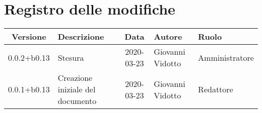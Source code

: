 \section*{Registro delle modifiche}

\begin{center}
	\begin{longtable}{|c|p{3.5cm}|c|p{3cm}|p{3cm}|}
	\hline
	\rowcolor{lighter-grayer}
	\textbf{Versione} & \textbf{Descrizione} & \textbf{Data} & \textbf{Autore} & \textbf{Ruolo} \\
	\hline
	\endfirsthead

	0.0.2+b0.13 & Stesura & 2020-03-23 & Giovanni Vidotto & Amministratore \\
	\hline
	0.0.1+b0.13 & Creazione iniziale del documento & 2020-03-23 & Giovanni Vidotto & Redattore \\
	\hline

	\end{longtable}
\end{center}
